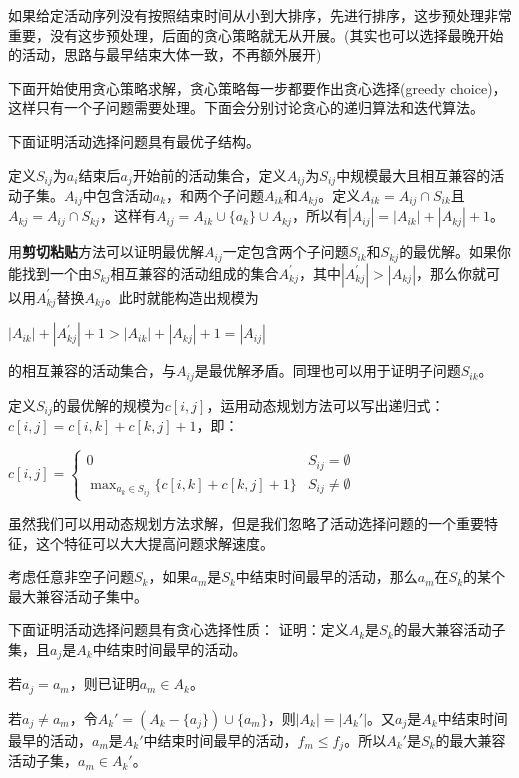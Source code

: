 \documentclass[./../main.tex]{subfiles}
\begin{document}
如果给定活动序列没有按照结束时间从小到大排序，先进行排序，这步预处理非常重要，没有这步预处理，后面的贪心策略就无从开展。(其实也可以选择最晚开始的活动，思路与最早结束大体一致，不再额外展开)

下面开始使用贪心策略求解，贪心策略每一步都要作出贪心选择(greedy choice)，这样只有一个子问题需要处理。下面会分别讨论贪心的递归算法和迭代算法。

下面证明活动选择问题具有最优子结构。

定义$S_{ij}$为$a_{i}$结束后$a_{j}$开始前的活动集合，定义$A_{ij}$为$S_{ij}$中规模最大且相互兼容的活动子集。$A_{ij}$中包含活动$a_{k}$，和两个子问题$A_{ik}$和$A_{kj}$。定义$A_{ik}=A_{ij}\cap S_{ik}$且$A_{kj}=A_{ij}\cap S_{kj}$，这样有$A_{ij}=A_{ik}\cup\{a_{k}\}\cup A_{kj}$，所以有$|A_{ij}|=|A_{ik}|+|A_{kj}|+1$。

用\textbf{剪切粘贴}方法可以证明最优解$A_{ij}$一定包含两个子问题$S_{ik}$和$S_{kj}$的最优解。如果你能找到一个由$S_{kj}$相互兼容的活动组成的集合$A_{kj}^{\prime}$，其中$|A_{kj}^{\prime}|>|A_{kj}|$，那么你就可以用$A_{kj}^{\prime}$替换$A_{kj}$。此时就能构造出规模为

$|A_{ik}|+|A_{kj}^{\prime}|+1>|A_{ik}|+|A_{kj}|+1=|A_{ij}|$

的相互兼容的活动集合，与$A_{ij}$是最优解矛盾。同理也可以用于证明子问题$S_{ik}$。

定义$S_{ij}$的最优解的规模为$c[i,j]$，运用动态规划方法可以写出递归式：$c[i,j]=c[i,k]+c[k,j]+1$，即：

$c[i,j]=\left\{\begin{array}{ll}
0 & S_{ij}=\emptyset \\
\max_{a_{k}\in S_{ij}}\{c[i,k]+c[k,j]+1\} & S_{ij}\neq\emptyset
\end{array}\right.$

虽然我们可以用动态规划方法求解，但是我们忽略了活动选择问题的一个重要特征，这个特征可以大大提高问题求解速度。

考虑任意非空子问题$S_{k}$，如果$a_{m}$是$S_{k}$中结束时间最早的活动，那么$a_{m}$在$S_{k}$的某个最大兼容活动子集中。

下面证明活动选择问题具有贪心选择性质：
证明：定义$A_{k}$是$S_{k}$的最大兼容活动子集，且$a_{j}$是$A_{k}$中结束时间最早的活动。

若$a_{j}=a_{m}$，则已证明$a_{m}\in A_{k}$。

若$a_{j}\neq a_{m}$，令$A_{k}'=(A_{k}-\{a_{j}\})\cup\{a_{m}\}$，则$|A_{k}|=|A_{k}'|$。又$a_{j}$是$A_{k}$中结束时间最早的活动，$a_{m}$是$A_{k}'$中结束时间最早的活动，$f_{m}\leq f_{j}$。所以$A_{k}'$是$S_{k}$的最大兼容活动子集，$a_{m}\in A_{k}'$。
\end{document}
